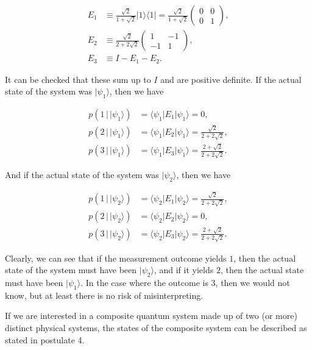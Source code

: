 \documentclass{article}
\theoremstyle{definition}
\begin{document}
    \begin{align*}
      E_1 & \equiv \frac{\sqrt{2}}{1 + \sqrt{2}} |1\rangle \langle 1| = \frac{\sqrt{2}}{1 + \sqrt{2}} \begin{pmatrix} 0&0\\0&1 \end{pmatrix}, \\
      E_2 & \equiv \frac{\sqrt{2}}{2 + 2 \sqrt{2}} \begin{pmatrix} 1 & -1 \\ -1 & 1 \end{pmatrix}, \\
      E_3 & \equiv I - E_1 - E_2.
    \end{align*}

    It can be checked that these sum up to $I$ and are positive definite. If the actual state of the system was $|\psi_1 \rangle$, then we have

    \begin{align*}
      p(1 \,|\, |\psi_1 \rangle) & = \langle \psi_1 | E_1 | \psi_1 \rangle = 0, \\
      p(2 \,|\, |\psi_1 \rangle) & = \langle \psi_1 | E_2 | \psi_1 \rangle = \frac{\sqrt{2}}{2 + 2\sqrt{2}}, \\
      p(3 \,|\, |\psi_1 \rangle) & = \langle \psi_1 | E_3 | \psi_1 \rangle =  \frac{2 + \sqrt{2}}{2 + 2\sqrt{2}}.
    \end{align*}

    And if the actual state of the system was $|\psi_2 \rangle$, then we have

    \begin{align*}
      p(1 \,|\, |\psi_2 \rangle) & = \langle \psi_2 | E_1 | \psi_2 \rangle = \frac{\sqrt{2}}{2 + 2\sqrt{2}}, \\
      p(2 \,|\, |\psi_2 \rangle) & = \langle \psi_2 | E_2 | \psi_2 \rangle = 0, \\
      p(3 \,|\, |\psi_2 \rangle) & = \langle \psi_2 | E_3 | \psi_2 \rangle =  \frac{2 + \sqrt{2}}{2 + 2\sqrt{2}}.
    \end{align*}

    Clearly, we can see that if the measurement outcome yields $1$, then the actual state of the system must have been $|\psi_2\rangle$, and if it yields $2$, then the actual state must have been $|\psi_1 \rangle$. In the case where the outcome is $3$, then we would not know, but at least there is no risk of misinterpreting.

    If we are interested in a composite quantum system made up of two (or more) distinct physical systems, the states of the composite system can be described as stated in postulate 4. 
\end{document}
